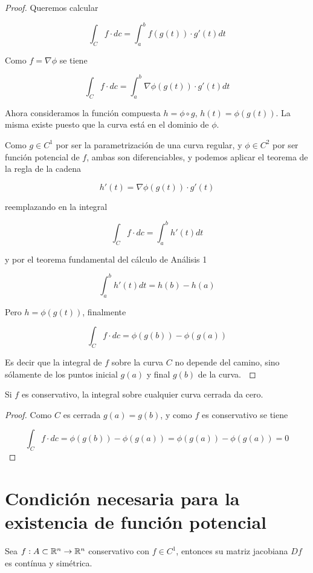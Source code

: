 \begin{proof}
Queremos calcular 

$$\int_C f \cdot dc = \int_a^b f(g(t)) \cdot g'(t) dt$$

Como $ f = \nabla \phi$ se tiene

$$\int_C f \cdot dc = \int_a^b \nabla \phi(g(t)) \cdot g'(t) dt$$

Ahora consideramos la función compuesta $ h = \phi \circ g$, $h(t) = \phi(g(t))$.  La misma existe puesto que la curva está en el dominio de $\phi$.

Como $g \in C^1$ por ser la parametrización de una curva regular, y $\phi \in C^2$ por ser función potencial de $f$, ambas son diferenciables, y podemos aplicar el teorema de la regla de la cadena

$$ h'(t) = \nabla \phi(g(t)) \cdot g'(t) $$

reemplazando en la integral

$$ \int_C f \cdot dc = \int_a^b h'(t) dt $$

y por el teorema fundamental del cálculo de Análisis 1

$$ \int_a^b h'(t) dt = h(b) - h(a) $$

Pero $h = \phi(g(t))$, finalmente

$$\int_C f \cdot dc = \phi(g(b)) - \phi(g(a))$$

Es decir que la integral de $f$ sobre la curva $C$ no depende del camino, sino sólamente de los puntos inicial $g(a)$ y final $g(b)$ de la curva. $\qedhere$
\end{proof}

\begin{corollary}
Si $f$ es conservativo, la integral sobre cualquier curva cerrada da cero.
\end{corollary}

\begin{proof}
Como $C$ es cerrada $ g(a) = g(b)$, y como $f$ es conservativo se tiene

$$ \int_C f \cdot dc = \phi(g(b)) - \phi(g(a)) = \phi(g(a)) - \phi(g(a)) = 0$$ 
\end{proof}

\section{Condición necesaria para la existencia de función potencial}

\begin{theorem}[Necesaria] \label{necesaria_potencial} 
Sea $f : A \subset \mathbb{R}^n \to \mathbb{R}^n$ conservativo con $ f \in C^1$, entonces su matriz jacobiana $Df$ es contínua y simétrica.
\end{theorem}


